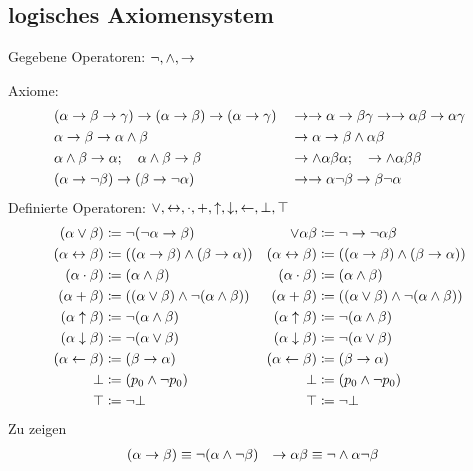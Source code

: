 \documentclass[english,ngerman,parskip=half,headsepline,footsepline]{scrreprt}
\begin{document}
	\subsection{logisches Axiomensystem}%
	\label{sub:Axiome}
	Gegebene Operatoren: $\lnot,\land,\rightarrow$\par
	Axiome:
	\begin{align}
		&(\alpha\rightarrow\beta\rightarrow\gamma)\rightarrow(\alpha\rightarrow\beta)\rightarrow(\alpha\rightarrow\gamma)
		&&\rightarrow\rightarrow\alpha\rightarrow\beta\gamma\rightarrow\rightarrow\alpha\beta\rightarrow\alpha\gamma\\
		&\alpha\rightarrow\beta\rightarrow\alpha\land\beta
		&&\rightarrow\alpha\rightarrow\beta\land\alpha\beta\\
		&\alpha\land\beta\rightarrow\alpha ;\quad\alpha\land\beta\rightarrow\beta
		&&\rightarrow\land\alpha\beta\alpha ;\quad\rightarrow\land\alpha\beta\beta\\
		&(\alpha\rightarrow\lnot\beta)\rightarrow(\beta\rightarrow\lnot\alpha)
		&&\rightarrow\rightarrow\alpha\lnot\beta\rightarrow\beta\lnot\alpha
	\end{align}
	Definierte Operatoren: $\lor,\leftrightarrow,\cdot,+,\uparrow,\downarrow,\leftarrow,\bot,\top$
	\begin{align}
		(\alpha\lor\beta)&\coloneqq\lnot(\lnot\alpha\rightarrow\beta)
		&\lor\alpha\beta&\coloneqq\lnot\rightarrow\lnot\alpha\beta\\
		(\alpha\leftrightarrow\beta)&\coloneqq((\alpha\rightarrow\beta)\land(\beta\rightarrow\alpha))
		&(\alpha\leftrightarrow\beta)&\coloneqq((\alpha\rightarrow\beta)\land(\beta\rightarrow\alpha))\\
		(\alpha\cdot\beta)&\coloneqq(\alpha\land\beta)
		&(\alpha\cdot\beta)&\coloneqq(\alpha\land\beta)\\
		(\alpha+\beta)&\coloneqq((\alpha\lor\beta)\land\lnot(\alpha\land\beta))
		&(\alpha+\beta)&\coloneqq((\alpha\lor\beta)\land\lnot(\alpha\land\beta))\\
		(\alpha\uparrow\beta)&\coloneqq\lnot(\alpha\land\beta)
		&(\alpha\uparrow\beta)&\coloneqq\lnot(\alpha\land\beta)\\
		(\alpha\downarrow\beta)&\coloneqq\lnot(\alpha\lor\beta)
		&(\alpha\downarrow\beta)&\coloneqq\lnot(\alpha\lor\beta)\\
		(\alpha\leftarrow\beta)&\coloneqq(\beta\rightarrow\alpha)
		&(\alpha\leftarrow\beta)&\coloneqq(\beta\rightarrow\alpha)\\
		\bot&\coloneqq(p_0\land\lnot p_0)
		&\bot&\coloneqq(p_0\land\lnot p_0)\\
		\top&\coloneqq\lnot\bot
		&\top&\coloneqq\lnot\bot
	\end{align}
	Zu zeigen
	\begin{align}
		(\alpha\rightarrow\beta)&\equiv\lnot(\alpha\land\lnot\beta)
		&\rightarrow\alpha\beta&\equiv\lnot\land\alpha\lnot\beta
	\end{align}
\end{document}
